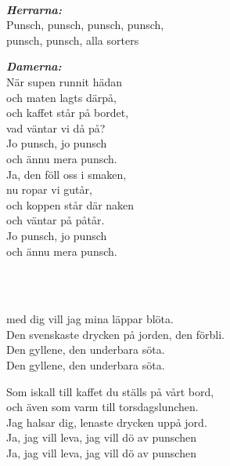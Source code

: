  \\



\melochtext{}

\songtext{} 
\textbf{\textit{Herrarna:}} \\
\leftrepeat Punsch, punsch, punsch, punsch,\\
punsch, punsch, alla sorters \rightrepeat

\textbf{\textit{Damerna:}}\\
När supen runnit hädan\\
och maten lagts därpå,\\
och kaffet står på bordet,\\
vad väntar vi då på?\\
\leftrepeat Jo punsch, jo punsch\\
och ännu mera punsch. \rightrepeat\\
Ja, den föll oss i smaken,\\
nu ropar vi gutår,\\
och koppen står där naken\\
och väntar på påtår.\\
\leftrepeat Jo punsch, jo punsch\\
och ännu mera punsch. \rightrepeat\\


\newpage


 \\       
\author{Text: Magnus Hartikainen }

\\ 
med dig vill jag mina läppar blöta.\\
Den svenskaste drycken på jorden, den förbli.\\
Den gyllene, den underbara söta.\\
Den gyllene, den underbara söta.

Som iskall till kaffet du ställs på vårt bord, \\
och även som varm till torsdagslunchen.\\
Jag halsar dig, lenaste drycken uppå jord.\\
Ja, jag vill leva, jag vill dö av punschen\\
Ja, jag vill leva, jag vill dö av punschen\\


